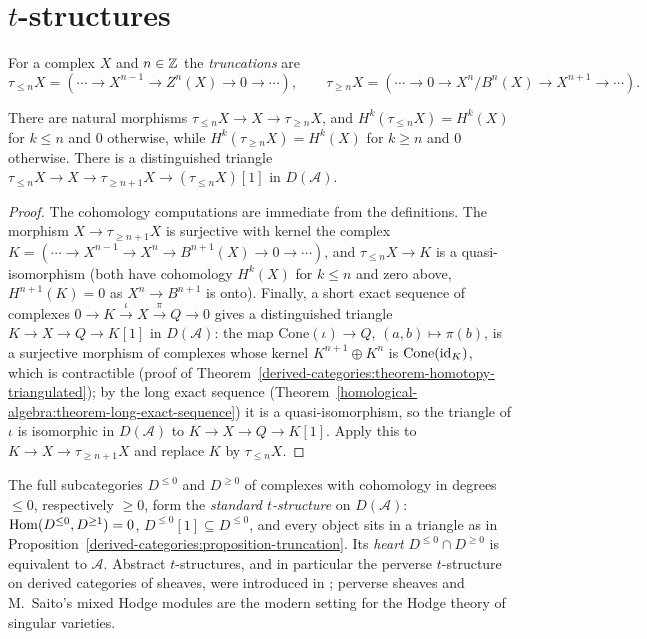 \section{$t$-structures}\label{derived-categories:section-t-structures}

\begin{definition}\label{derived-categories:definition-truncation}
For a complex $X$ and $n \in \mathbb{Z}$ the \emph{truncations} are
\[
\tau_{\leq n}X = (\cdots \to X^{n-1} \to Z^n(X) \to 0 \to \cdots), \qquad
\tau_{\geq n}X = (\cdots \to 0 \to X^n/B^n(X) \to X^{n+1} \to \cdots).
\]
\end{definition}

\begin{proposition}\label{derived-categories:proposition-truncation}
There are natural morphisms $\tau_{\leq n}X \to X \to \tau_{\geq n}X$, and $H^k(\tau_{\leq n}X) = H^k(X)$ for $k \leq n$ and $0$ otherwise, while
$H^k(\tau_{\geq n}X) = H^k(X)$ for $k \geq n$ and $0$ otherwise. There is a distinguished triangle
$\tau_{\leq n}X \to X \to \tau_{\geq n+1}X \to (\tau_{\leq n}X)[1]$ in $D(\mathcal{A})$.
\end{proposition}

\begin{proof}
The cohomology computations are immediate from the definitions. The morphism $X \to \tau_{\geq n+1}X$ is surjective with kernel the complex
$K = (\cdots \to X^{n-1} \to X^n \to B^{n+1}(X) \to 0 \to \cdots)$, and $\tau_{\leq n}X \to K$ is a quasi-isomorphism (both have cohomology $H^k(X)$ for
$k \leq n$ and zero above, $H^{n+1}(K) = 0$ as $X^n \to B^{n+1}$ is onto). Finally, a short exact sequence of complexes $0 \to K \xrightarrow{\iota} X \xrightarrow{\pi} Q \to 0$ gives a distinguished triangle
$K \to X \to Q \to K[1]$ in $D(\mathcal{A})$: the map $\mathrm{Cone}(\iota) \to Q$, $(a, b) \mapsto \pi(b)$, is a surjective morphism of complexes whose kernel
$K^{n+1} \oplus K^n$ is $\mathrm{Cone}(\mathrm{id}_K)$, which is contractible (proof of
Theorem~\ref{derived-categories:theorem-homotopy-triangulated}); by the long exact sequence
(Theorem~\ref{homological-algebra:theorem-long-exact-sequence}) it is a quasi-isomorphism, so the triangle of $\iota$ is isomorphic in
$D(\mathcal{A})$ to $K \to X \to Q \to K[1]$. Apply this to $K \to X \to \tau_{\geq n+1}X$ and replace $K$ by $\tau_{\leq n}X$.
\end{proof}

\begin{remark}\label{derived-categories:remark-t-structures}
The full subcategories $D^{\leq 0}$ and $D^{\geq 0}$ of complexes with cohomology in degrees $\leq 0$, respectively $\geq 0$, form the \emph{standard
$t$-structure} on $D(\mathcal{A})$: $\operatorname{Hom}(D^{\leq 0}, D^{\geq 1}) = 0$, $D^{\leq 0}[1] \subseteq D^{\leq 0}$, and every object sits in a triangle as in
Proposition~\ref{derived-categories:proposition-truncation}. Its \emph{heart} $D^{\leq 0} \cap D^{\geq 0}$ is equivalent to $\mathcal{A}$. Abstract
$t$-structures, and in particular the perverse $t$-structure on derived categories of sheaves, were introduced in \cite{bbd}; perverse sheaves
and M.~Saito's mixed Hodge modules are the modern setting for the Hodge theory of singular varieties.
\end{remark}

